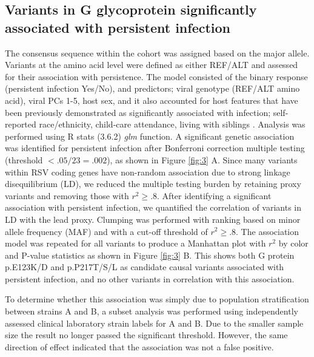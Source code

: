 \documentclass{article}
\begin{document}
\subsection{Variants in G glycoprotein significantly associated with persistent infection}
The consensus sequence within the cohort was assigned based on the major allele.
Variants at the amino acid level were defined as either REF/ALT and assessed for their association with persistence.
The model consisted of
the binary response (persistent infection Yes/No),
and predictors; viral genotype (REF/ALT amino acid), viral PCs 1-5, host sex, and it also accounted for host features that have been previously demonstrated as significantly associated with infection;
self-reported race/ethnicity, child-care attendance, living with siblings
\cite{hall1976respiratory}.
Analysis was performed using R stats (3.6.2) \textit{glm} function. 
A significant genetic association was identified for persistent infection after Bonferroni correction multiple testing (threshold $<.05/23=.002$), 
as shown in 
Figure \ref{fig:3} A. 
Since many variants within RSV coding genes have non-random association due to strong linkage disequilibrium (LD), 
we reduced the multiple testing burden by retaining proxy variants and removing those with
$r^2 \ge .8$.
After identifying a significant association with persistent infection,
we quantified the correlation of variants in LD with the lead proxy.
Clumping was performed with ranking based on minor allele frequency (MAF) and with a cut-off threshold of $r^2 \ge .8$.
The association model was repeated for all variants to produce a Manhattan plot with $r^2$ by color and P-value statistics as shown in 
Figure \ref{fig:3} B.
This shows both G protein 
p.E123K/D and 
p.P217T/S/L as candidate causal variants associated with persistent infection, and no other variants in correlation with this association. 

To determine whether this association was simply due to population stratification between strains A and B, a subset analysis was performed using independently assessed clinical laboratory strain labels for A and B.
Due to the smaller sample size the result no longer passed the significant threshold. 
However, the same direction of effect indicated that the association was not a false positive. 
\end{document}
